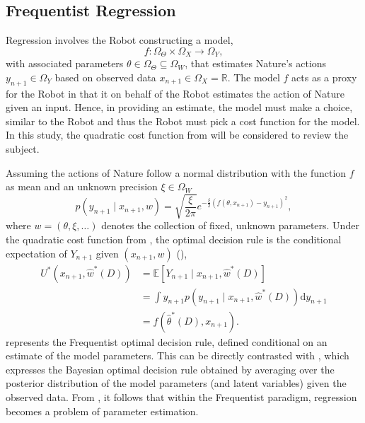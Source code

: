 \subsection{Frequentist Regression}
\label{chp:frequentist_regression}
Regression involves the Robot constructing a model,
\begin{equation}
	f\colon \Omega_\Theta \times \Omega_X \to \Omega_Y,
\end{equation}
with associated parameters $\theta \in \Omega_\Theta\subseteq \Omega_W$, that estimates Nature's actions $y_{n+1}\in \Omega_Y$ based on observed data $x_{n+1}\in \Omega_X=\mathbb{R}$. The model $f$ acts as a proxy for the Robot in that it on behalf of the Robot estimates the action of Nature given an input. Hence, in providing an estimate, the model must make a choice, similar to the Robot and thus the Robot must pick a cost function for the model. In this study, the quadratic cost function from  will be considered to review the subject.


Assuming the actions of Nature follow a normal distribution with the function $f$ as mean and an unknown precision $\xi \in \Omega_{W}$
\begin{equation}
	p(y_{n+1}\mid x_{n+1},w)=\sqrt{\frac{\xi}{2\pi}} e^{-\frac{\xi}{2}(f(\theta,x_{n+1})-y_{n+1})^2},
	\label{freq:dist}
\end{equation}
where $w = (\theta, \xi,\dots)$ denotes the collection of fixed, unknown parameters. Under the quadratic cost function from , the optimal decision rule is the conditional expectation of $Y_{n+1}$ given $(x_{n+1},w)$ (),
\begin{equation}
	\begin{split}
		U^*(x_{n+1},\hat{w}^*(D)) &= \mathbb{E}[Y_{n+1} \mid x_{n+1}, \hat{w}^*(D)]\\
		&= \int y_{n+1} p(y_{n+1} \mid x_{n+1}, \hat{w}^*(D)) \mathrm{d}y_{n+1}\\
		& = f(\hat{\theta}^*(D),x_{n+1}).
	\end{split}
	\label{freq:decision}
\end{equation}
 represents the Frequentist optimal decision rule, defined conditional on an estimate of the model parameters. This can be directly contrasted with , which expresses the Bayesian optimal decision rule obtained by averaging over the posterior distribution of the model parameters (and latent variables) given the observed data. From , it follows that within the Frequentist paradigm, regression becomes a problem of parameter estimation.

